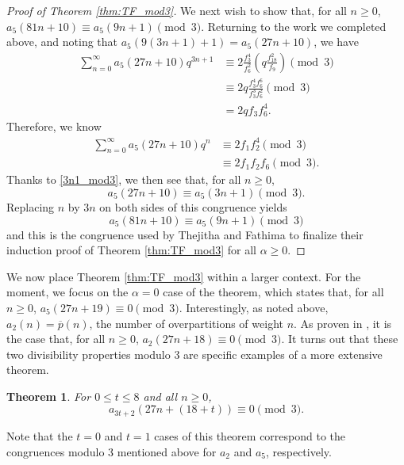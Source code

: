 \documentclass[10pt, reqno]{amsart}
\theoremstyle{theorem}
\newtheorem{theorem}{Theorem}[section]
\theoremstyle{definition}
\theoremstyle{example}
\begin{document}
\begin{proof}[Proof of Theorem  \ref{thm:TF_mod3}]
We next wish to show that, for all $n\geq 0$, $a_5(81n+10)\equiv a_5(9n+1) \pmod{3}.$  Returning to the work we completed above, and noting that $a_5(9(3n+1)+1) = a_5(27n+10)$, we have 
\begin{align*}
\sum_{n=0}^\infty a_5(27n+10)q^{3n+1} 
&\equiv 
2\frac{f_3^4}{f_6^2}\left(q\frac{f_{18}^2}{f_9} \right) \pmod{3} \\
&\equiv 
2q\frac{f_3^4f_6^6}{f_3^3f_6^2}\pmod{3} \\
&= 
2qf_3f_6^4.
\end{align*}
Therefore, we know 
\begin{align*}
\sum_{n=0}^\infty a_5(27n+10)q^{n} 
&\equiv 
2f_1f_2^4 \pmod{3} \\
&\equiv 
2f_1f_2f_6 \pmod{3}.
\end{align*}
Thanks to \eqref{3n1_mod3}, we then see that, for all $n\geq 0$, 
$$
a_5(27n+10) \equiv a_5(3n+1) \pmod{3}.
$$
Replacing $n$ by $3n$ on both sides of this congruence yields $$
a_5(81n+10) \equiv a_5(9n+1) \pmod{3}
$$
and this is the congruence used by Thejitha and Fathima \cite{TF} to finalize their induction proof of Theorem \ref{thm:TF_mod3} for all $\alpha\geq 0$.  
\end{proof}

We now place Theorem \ref{thm:TF_mod3} within a larger context.  For the moment, we focus on the $\alpha=0$ case of the theorem, which states that, for all $n\geq 0$, $a_5(27n+19) \equiv 0 \pmod{3}$.  Interestingly, as noted above, $a_2(n) = \overline{p}(n)$, the number of overpartitions of weight $n$.  As proven in \cite[Theorem 2.1]{HS2005}, it is the case that,  for all $n\geq 0$, $a_2(27n+18) \equiv 0 \pmod{3}$.
It turns out that these two divisibility properties modulo 3 are specific examples of a more extensive theorem.  

\begin{theorem}
\label{thm:mod3_divisibilities}
For $0\leq t\leq 8$ and all $n\geq 0$, 
$$a_{3t+2}(27n+(18+t)) \equiv 0 \pmod{3}.$$ 
\end{theorem}
Note that the $t=0$ and $t=1$ cases of this theorem correspond to the congruences modulo 3 mentioned above for $a_2$ and $a_5$, respectively.  
\end{document}

